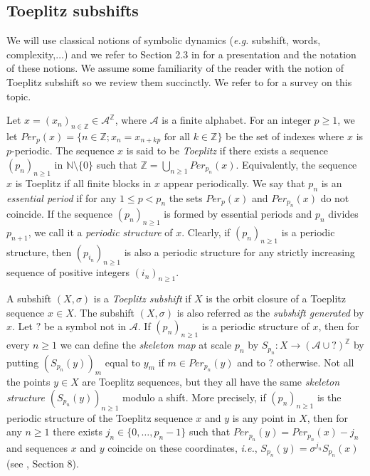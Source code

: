 \documentclass{daj}
\theoremstyle{plain}
\theoremstyle{definition}
\begin{document}
\subsection{Toeplitz subshifts} \label{Sec:BackgroundToeplitz}
We will use classical notions of symbolic dynamics ({\em e.g.} subshift, words, complexity,$\ldots$) and we refer to Section 2.3 in \cite{DonosoDurandMaassPetite} for a presentation  and the notation of these notions.
We assume some familiarity of the reader with the notion of Toeplitz subshift so we review them succinctly. We refer to \cite{Downarowicz:2005} for a survey on this topic.

Let $x=(x_n)_{n\in \mathbb{Z}} \in {\mathcal{A}}^\mathbb{Z}$, where ${\mathcal{A}}$ is a finite alphabet. For an integer $p \geq 1$, we let 
$Per_p(x)= \{ n \in \mathbb{Z}; x_{n}=x_{n+k p}\text{ for all } k\in \mathbb{Z} \}$ be the set of indexes where $x$ is $p$-periodic. The sequence $x$ is said to be \emph{Toeplitz} if there exists a sequence $(p_n)_{n\geq 1}$ in $\mathbb{N}\setminus\{0\}$ such that 
$\mathbb{Z}=\bigcup_{n\geq 1} Per_{p_n}(x)$. Equivalently, the sequence $x$ is Toeplitz if all finite blocks in $x$ appear periodically. We say that $p_n$ is an 
\emph{essential period} if for any $1 \leq p <p_n$ the sets $Per_{p}(x)$ and $Per_{p_n}(x)$ do not coincide. If the sequence $(p_n)_{n\geq 1}$ is formed by essential periods and $p_n$ divides $p_{n+1}$, we call it a \emph{periodic structure} of $x$. Clearly, if $(p_n)_{n\geq 1}$ is a periodic structure, then 
$(p_{i_n})_{n\geq 1}$ is also a periodic structure for any strictly increasing sequence of positive integers $(i_n)_{n\geq 1}$. 

A subshift $(X,\sigma)$ is a \emph{Toeplitz subshift} if $X$ is the orbit closure of a Toeplitz sequence $x \in X$. 
The subshift $(X, \sigma)$ is also referred as the {\em subshift generated} by $x$.
Let  $\textbf{?}$ be a symbol not in $\mathcal{A}$. If $(p_n)_{n\geq 1}$ is a  periodic structure of $x$, then for every $n \geq 1$ we can define the \emph{skeleton map} at scale $p_n$ by $S_{p_n}\colon X\to (\mathcal{A}\cup \text{?})^{\mathbb{Z}}$ by putting  
$(S_{p_n}(y))_{m}$  equal to $y_m$ if $m \in Per_{p_n}(y)$ and to $?$ otherwise. 
Not all the points $y \in X$ are Toeplitz sequences, but they all have the same {\em skeleton structure} $(S_{p_n}(y))_{n\geq 1}$ modulo a shift. More precisely, if $(p_n)_{n\geq 1}$ is the periodic structure of the Toeplitz sequence $x$ and $y$ is any point in $X$, then for any $n\geq 1$ there exists $j_n\in \{0,\ldots,p_n-1\}$ such that $Per_{p_n}(y)=Per_{p_n}(x)-j_n$ and sequences $x$ and $y$ coincide on these coordinates, {\em i.e.}, $S_{p_n}(y)=\sigma^{j_n}S_{p_n}(x)$ (see \cite{Downarowicz:2005}, Section 8).  
\end{document}
